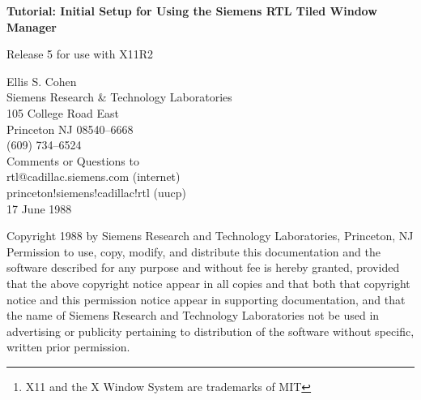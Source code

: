 \begin{titlepage}

\begin{center}
{\LARGE\bf
Tutorial:
Initial Setup for Using the
Siemens RTL
Tiled Window Manager 
\vspace{1ex}

\large
Release 5
for use with X11R2
\vspace{3ex}

Ellis S. Cohen\\
Siemens Research \& Technology Laboratories\\
105 College Road East\\
Princeton NJ 08540--6668\\
(609) 734--6524\\[1ex]
Comments or Questions to\\
rtl@cadillac.siemens.com (internet)\\
princeton!siemens!cadillac!rtl (uucp)\\[1ex]
17 June 1988
}
\end{center}

\vfill
\begin{abstract}
This tutorial describes how to become an initial user of the Siemens {\bf rtl}
Tiled Window Manager.
It assumes that you already know how to start the X11R2\footnote{
X11 and the X Window System are trademarks of MIT} server
and are familiar with X11 applications.

The tutorial explains how to set up customization files, how to set up
your initial window layout along with per-window options, and how to save
that layout.
Once the layout is saved, it will automatically be recreated when you
start up the system in the future.

A {\bf Quick Reference Page} describing the actions associated with mouse
buttons, and a {\bf Manual} are also available.
\end{abstract}

\vfill

\noindent Copyright 1988 by Siemens Research and Technology
Laboratories, Princeton, NJ \\

\noindent Permission to use, copy, modify, and distribute this documentation and
the software described for any purpose and without fee is hereby granted,
provided that the above copyright notice appear in all copies and that
both that copyright notice and this permission notice appear in
supporting documentation, and that the name of Siemens Research and Technology
Laboratories not be used in advertising or publicity pertaining to
distribution of the software without specific, written prior
permission. \\


\end{titlepage}
